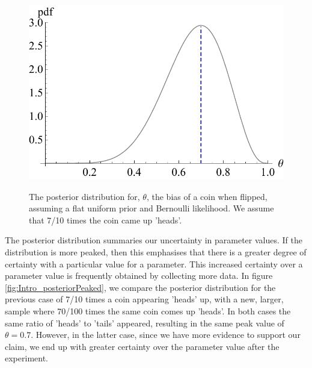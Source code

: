 \documentclass[11pt,fullpage]{book}
\begin{document}
\begin{figure}
\centering
\scalebox{0.6} 
{\includegraphics{Intro_posterior.pdf}}
\caption{The posterior distribution for, $\theta$, the bias of a coin when flipped, assuming a flat uniform prior and Bernoulli likelihood. We assume that 7/10 times the coin came up 'heads'.}\label{fig:Intro_posterior}
\end{figure}

The posterior distribution summaries our uncertainty in parameter values. If the distribution is more peaked, then this emphasises that there is a greater degree of certainty with a particular value for a parameter. This increased certainty over a parameter value is frequently obtained by collecting more data. In figure \ref{fig:Intro_posteriorPeaked}, we compare the posterior distribution for the previous case of 7/10 times a coin appearing 'heads' up, with a new, larger, sample where 70/100 times the same coin comes up 'heads'. In both cases the same ratio of 'heads' to 'tails' appeared, resulting in the same peak value of $\theta=0.7$. However, in the latter case, since we have more evidence to support our claim, we end up with greater certainty over the parameter value after the experiment.
\end{document}
